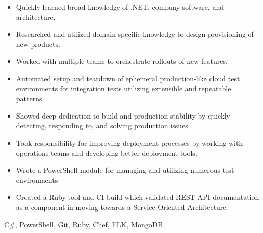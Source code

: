\begin{experiences}
{\begin{itemize}
                        \item Quickly learned broad knowledge of .NET, company software, and architecture.
                        \item Researched and utilized domain-specific knowledge to design provisioning of new products.
                        \ifcv
                        \item Worked with multiple teams to orchestrate rollouts of new features.
                        \item Automated setup and teardown of ephemeral production-like cloud test environments for integration tests utilizing extensible and repeatable patterns.
                        \item Showed deep dedication to build and production stability by quickly detecting, responding to, and solving production issues.
                        \item Took responsibility for improving deployment processes by working with operations teams and developing better deployment tools.
                        \item Wrote a PowerShell module for managing and utilizing numerous test environments
                        \item Created a Ruby tool and CI build which validated REST API documentation as a component in moving towards a Service Oriented Architecture.
                        \fi
                      \end{itemize}
                    }
                    {C\#, PowerShell, Git, Ruby, Chef, ELK, MongoDB}
\end{experiences}
